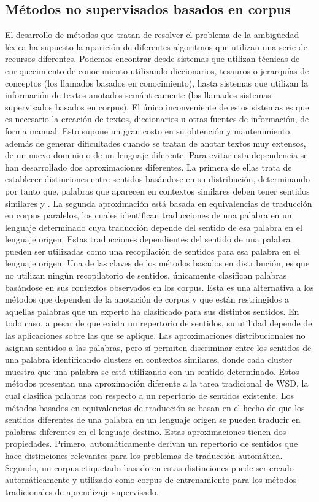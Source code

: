 \subsection{Métodos no supervisados basados en corpus}
El desarrollo de métodos que tratan de resolver el problema de la ambigüedad léxica ha supuesto la aparición de diferentes algoritmos que utilizan una serie de recursos diferentes. Podemos encontrar desde sistemas que utilizan técnicas de enriquecimiento de conocimiento utilizando diccionarios, tesauros o jerarquías de conceptos (los llamados basados en conocimiento), hasta sistemas que utilizan la información de textos anotados semánticamente (los llamados sistemas supervisados basados en corpus). El único inconveniente de estos sistemas es que es necesario la creación de textos, diccionarios u otras fuentes de información, de forma manual.
Esto supone un gran costo en su obtención y mantenimiento, además de generar dificultades cuando se tratan de anotar textos muy extensos, de un nuevo dominio o de un lenguaje diferente. Para evitar esta dependencia se han desarrollado dos aproximaciones diferentes. La primera de ellas trata de establecer distinciones entre sentidos basándose en su distribución, determinando por tanto que, palabras que aparecen en contextos similares deben tener sentidos similares \cite{007} y \cite{008}. La segunda aproximación está basada en equivalencias de traducción en corpus paralelos, los cuales identifican traducciones de una palabra en un lenguaje determinado cuya traducción depende del sentido de esa palabra en el lenguaje origen. Estas traducciones dependientes del sentido de una palabra pueden ser utilizadas como una recopilación de sentidos para esa palabra en el lenguaje origen.
Una de las claves de los métodos basados en distribución, es que no utilizan ningún recopilatorio de sentidos, únicamente clasifican palabras basándose en sus contextos observados en los corpus. Esta es una alternativa a los métodos que dependen de la anotación de corpus y que están restringidos a aquellas palabras que un experto ha clasificado para sus distintos sentidos. En todo caso, a pesar de que exista un repertorio de sentidos, su utilidad depende de las aplicaciones sobre las que se aplique. Las aproximaciones distribucionales no asignan sentidos a las palabras, pero sí permiten discriminar entre los sentidos de una palabra identificando clusters en contextos similares, donde cada cluster muestra que una palabra se está utilizando con un sentido determinado. Estos métodos presentan una aproximación diferente a la tarea tradicional de WSD, la cual clasifica palabras con respecto a un repertorio de sentidos existente. Los métodos basados en equivalencias de traducción se basan en el hecho de que los sentidos diferentes de una palabra en un lenguaje origen se pueden traducir en palabras diferentes en el lenguaje destino. Estas aproximaciones tienen dos propiedades. Primero, automáticamente derivan un repertorio de sentidos que hace distinciones relevantes para los problemas de traducción automática. Segundo, un corpus etiquetado basado en estas distinciones puede ser creado automáticamente y utilizado como corpus de entrenamiento para los métodos tradicionales de aprendizaje supervisado.
